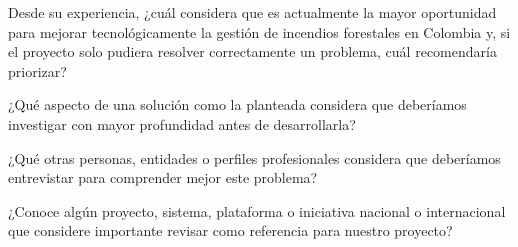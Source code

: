 \begin{enumerate}
  \pregunta Desde su experiencia, ¿cuál considera que es actualmente la mayor oportunidad para mejorar tecnológicamente la gestión de incendios forestales en Colombia y, si el proyecto solo pudiera resolver correctamente un problema, cuál recomendaría priorizar?

  \pregunta ¿Qué aspecto de una solución como la planteada considera que deberíamos investigar con mayor profundidad antes de desarrollarla?

  \pregunta ¿Qué otras personas, entidades o perfiles profesionales considera que deberíamos entrevistar para comprender mejor este problema?

  \pregunta ¿Conoce algún proyecto, sistema, plataforma o iniciativa nacional o internacional que considere importante revisar como referencia para nuestro proyecto?
\end{enumerate}
